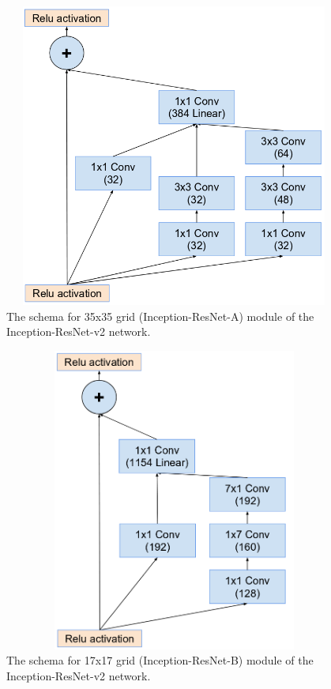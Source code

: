 \documentclass[a4paper,12pt, twoside]{NITKReport}
\begin{document}
\begin{figure}[h]
  \centering
    \includegraphics[height=10cm,width=13cm]{figure16.png}
    \caption{The  schema  for 35x35 grid  (Inception-ResNet-A) module of the Inception-ResNet-v2 network.~\cite{szegedy2017inception}}
    \label{16}

\end{figure}

\begin{figure}[h]
  \centering
   
    \includegraphics[height=10cm,width=13cm]{figure17.png}
    \caption{ The  schema  for 17x17 grid  (Inception-ResNet-B) module of the Inception-ResNet-v2 network.~\cite{szegedy2017inception}}
    \label{17}
 
 \end{figure}
 
\end{document}
